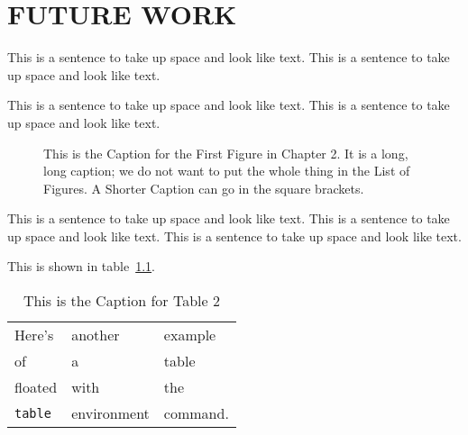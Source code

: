  
\chapter{FUTURE WORK}
This is a sentence to take up space and look like text.
This is a sentence to take up space and look like text.
 
This is a sentence to take up space and look like text.
This is a sentence to take up space and look like text.

\begin{figure}
\centering
\vspace{2.0in}
\caption[A Shorter Caption for the List of Figures]
   {This is the Caption for the First Figure in Chapter 2.  It is a
    long, long caption; we do not want to put the whole thing in the
    List of Figures. A Shorter Caption can go in the square brackets.}
\end{figure}
 
This is a sentence to take up space and look like text.
This is a sentence to take up space and look like text.
This is a sentence to take up space and look like text.

This is shown in table~\ref{mytable}.  %
 
\begin{table}
\caption{This is the Caption for Table 2}
\label{mytable}        %
\begin{center}
\begin{tabular}{lll}
Here's       & another     & example  \\
of           & a           & table    \\
floated      & with        & the      \\
\verb+table+ & environment & command.
\end{tabular}
\end{center}
\end{table}
 
